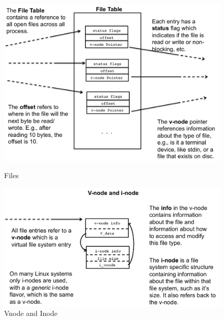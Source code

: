 \documentclass[../../lectures.tex]{subfiles}
\begin{document}
\begin{figure}[H]
\begin{minipage}[c]{0.5\linewidth}
\centering
\includegraphics[width=\textwidth]{images/file-table.png}
\caption{Files}
\end{minipage}
\hspace{0.5cm}
\begin{minipage}[c]{0.5\linewidth}
\includegraphics[width=\textwidth]{images/vnode-table.png}
\caption{Vnode and Inode}
\end{minipage}
\end{figure}
\end{document}
